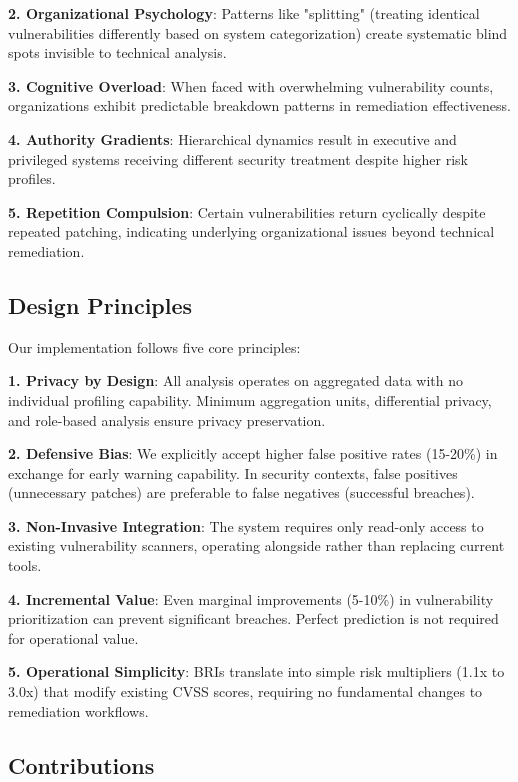 \documentclass[11pt,a4paper]{article}
\begin{document}
\textbf{2. Organizational Psychology}: Patterns like "splitting" (treating identical vulnerabilities differently based on system categorization) create systematic blind spots invisible to technical analysis.

\textbf{3. Cognitive Overload}: When faced with overwhelming vulnerability counts, organizations exhibit predictable breakdown patterns in remediation effectiveness.

\textbf{4. Authority Gradients}: Hierarchical dynamics result in executive and privileged systems receiving different security treatment despite higher risk profiles.

\textbf{5. Repetition Compulsion}: Certain vulnerabilities return cyclically despite repeated patching, indicating underlying organizational issues beyond technical remediation.

\subsection{Design Principles}

Our implementation follows five core principles:

\textbf{1. Privacy by Design}: All analysis operates on aggregated data with no individual profiling capability. Minimum aggregation units, differential privacy, and role-based analysis ensure privacy preservation.

\textbf{2. Defensive Bias}: We explicitly accept higher false positive rates (15-20\%) in exchange for early warning capability. In security contexts, false positives (unnecessary patches) are preferable to false negatives (successful breaches).

\textbf{3. Non-Invasive Integration}: The system requires only read-only access to existing vulnerability scanners, operating alongside rather than replacing current tools.

\textbf{4. Incremental Value}: Even marginal improvements (5-10\%) in vulnerability prioritization can prevent significant breaches. Perfect prediction is not required for operational value.

\textbf{5. Operational Simplicity}: BRIs translate into simple risk multipliers (1.1x to 3.0x) that modify existing CVSS scores, requiring no fundamental changes to remediation workflows.

\subsection{Contributions}
\end{document}

